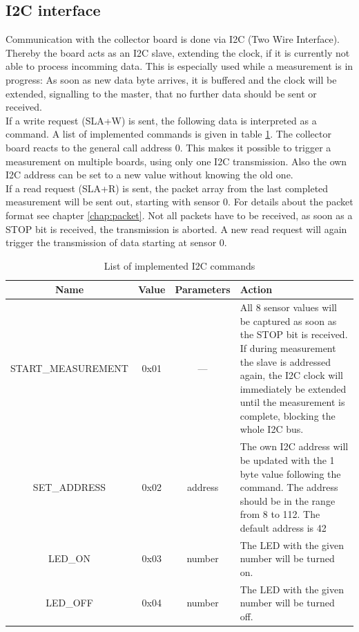 \documentclass[a4paper]{scrreprt}
\begin{document}
\subsection{I2C interface}
Communication with the collector board is done via I2C (Two Wire Interface). Thereby the board acts as an
I2C slave, extending the clock, if it is currently not able to process incomming data.
This is especially used while a measurement is in progress: As soon as new data byte arrives,
it is buffered and the clock will be extended, signalling to the master, that no further data should be sent or received.\\
If a write request (SLA+W) is sent, the following data is interpreted as a command. A list of implemented commands is given
in table \ref{tab:i2c}. The collector board reacts to the general call address 0. This makes it possible to trigger a measurement
on multiple boards, using only one I2C transmission. Also the own I2C address can be set to a new value without knowing the old one.\\
If a read request (SLA+R) is sent, the packet array from the last completed measurement will be sent out, starting with sensor 0.
For details about the packet format see chapter \ref{chap:packet}. Not all packets have to be received, as soon as a STOP bit is
received, the transmission is aborted. A new read request will again trigger the transmission of data starting at sensor 0.
\begin{table}[Hh!]
	\centering
	\begin{tabularx}{\textwidth}{ | c | c | c | X | }
		\hline
    Name & Value & Parameters & Action\\
		\hline
		\hline
    START\_MEASUREMENT & 0x01 & --- & All 8 sensor values will be
    captured as soon as the STOP bit is received. If during
    measurement
		the slave is addressed again, the I2C clock will immediately be extended until the measurement is complete, blocking the whole I2C bus.\\
		\hline
    SET\_ADDRESS & 0x02 & address & The own I2C address will be updated with the 1 byte value following the command. The address should
		be in the range from 8 to 112. The default address is 42\\
		\hline
    LED\_ON & 0x03 & number & The LED with the given number will be turned on.\\
		\hline
    LED\_OFF & 0x04 & number & The LED with the given number will be turned off.\\
		\hline
	\end{tabularx}
	\caption{List of implemented I2C commands}
	\label{tab:i2c}
\end{table}
\end{document}
